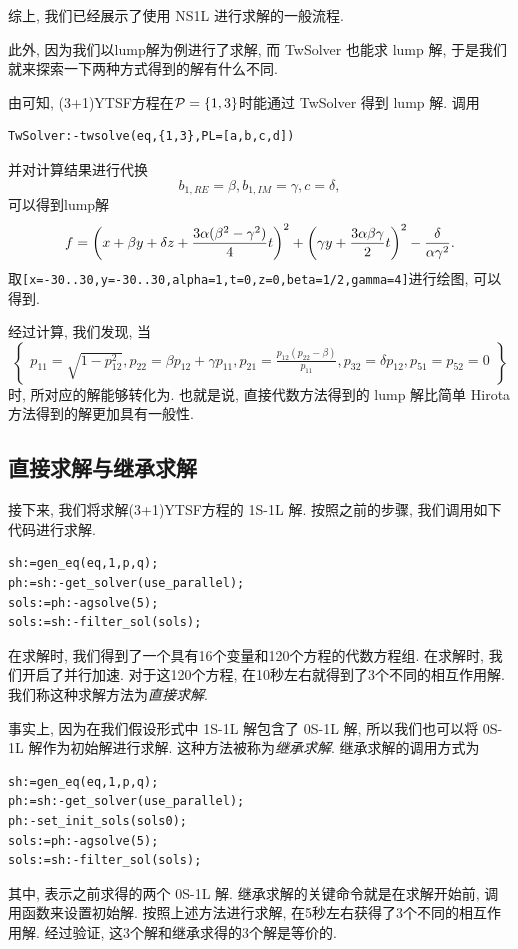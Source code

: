 综上, 我们已经展示了使用 NS1L 进行求解的一般流程. 

此外, 因为我们以lump解为例进行了求解, 而 TwSolver 也能求 lump 解, 于是我们就来探索一下两种方式得到的解有什么不同. 

由可知, (3+1)YTSF方程在$\mathcal{P}=\left\{1,3\right\}$时能通过 TwSolver 得到 lump 解. 调用
\begin{verbatim}
TwSolver:-twsolve(eq,{1,3},PL=[a,b,c,d])
\end{verbatim}
并对计算结果进行代换
\begin{equation}
    b_{1,RE}=\beta,b_{1,IM}=\gamma,c=\delta,
\end{equation}
可以得到lump解
\begin{equation}
    f=\left(x+\beta y + \delta z+ \frac{3\alpha (\beta^2-\gamma^2)}{4}t\right)^2+\left(\gamma y+\frac{3\alpha \beta \gamma}{2}t\right)^2-\frac{\delta}{\alpha \gamma^2}. \label{0S1L-3}
\end{equation}
取\verb|[x=-30..30,y=-30..30,alpha=1,t=0,z=0,beta=1/2,gamma=4]|进行绘图, 可以得到. 

经过计算, 我们发现, 当
\begin{equation}
\left\{ 
\begin{array}{l}
p_{11}=\sqrt{1-p_{12}^2},
p_{22}=\beta p_{12}+\gamma p_{11},
p_{21}=\frac{p_{12}(p_{22}-\beta)}{p_{11}},  
p_{32}=\delta p_{12},p_{51}=p_{52}=0
\end{array}
\right\}
\end{equation}
时, 所对应的解能够转化为. 也就是说, 直接代数方法得到的 lump 解比简单 Hirota 方法得到的解更加具有一般性. 

\subsection{直接求解与继承求解}

接下来, 我们将求解(3+1)YTSF方程的 1S-1L 解. 按照之前的步骤, 我们调用如下代码进行求解. 
\begin{verbatim}
sh:=gen_eq(eq,1,p,q);
ph:=sh:-get_solver(use_parallel);
sols:=ph:-agsolve(5);
sols:=sh:-filter_sol(sols);
\end{verbatim}

在求解时, 我们得到了一个具有16个变量和120个方程的代数方程组. 在求解时, 我们开启了并行加速. 对于这120个方程, 在10秒左右就得到了3个不同的相互作用解. 我们称这种求解方法为\emph{直接求解}.

事实上, 因为在我们假设形式中 1S-1L 解包含了 0S-1L 解, 所以我们也可以将 0S-1L 解作为初始解进行求解. 这种方法被称为\emph{继承求解}. 继承求解的调用方式为
\begin{verbatim}
sh:=gen_eq(eq,1,p,q);
ph:=sh:-get_solver(use_parallel);
ph:-set_init_sols(sols0);
sols:=ph:-agsolve(5);
sols:=sh:-filter_sol(sols);
\end{verbatim}
其中, 表示之前求得的两个 0S-1L 解. 继承求解的关键命令就是在求解开始前, 调用函数来设置初始解. 按照上述方法进行求解, 在5秒左右获得了3个不同的相互作用解. 经过验证, 这3个解和继承求得的3个解是等价的.

